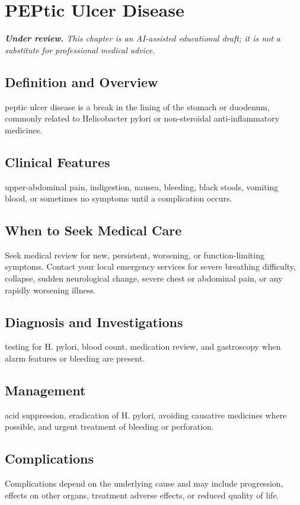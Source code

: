 \chapter{PEPtic Ulcer Disease}

\medskip
\noindent\textit{\textbf{Under review.} This chapter is an AI-assisted educational draft; it is not a substitute for professional medical advice.}

\section*{Definition and Overview}
peptic ulcer disease is a break in the lining of the stomach or duodenum, commonly related to Helicobacter pylori or non-steroidal anti-inflammatory medicines.

\section*{Clinical Features}
upper-abdominal pain, indigestion, nausea, bleeding, black stools, vomiting blood, or sometimes no symptoms until a complication occurs.

\section*{When to Seek Medical Care}
Seek medical review for new, persistent, worsening, or function-limiting symptoms. Contact your local emergency services for severe breathing difficulty, collapse, sudden neurological change, severe chest or abdominal pain, or any rapidly worsening illness.

\section*{Diagnosis and Investigations}
testing for H. pylori, blood count, medication review, and gastroscopy when alarm features or bleeding are present.

\section*{Management}
acid suppression, eradication of H. pylori, avoiding causative medicines where possible, and urgent treatment of bleeding or perforation.

\section*{Complications}
Complications depend on the underlying cause and may include progression, effects on other organs, treatment adverse effects, or reduced quality of life.


